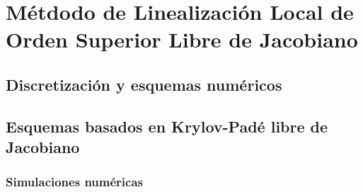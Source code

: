 \chapter{Métdodo de Linealización Local de Orden Superior Libre de Jacobiano}\label{chapter:llrk-fj}

\section{Discretización y esquemas numéricos}

\section{Esquemas basados en Krylov-Padé libre de Jacobiano}

\subsection{Simulaciones numéricas}